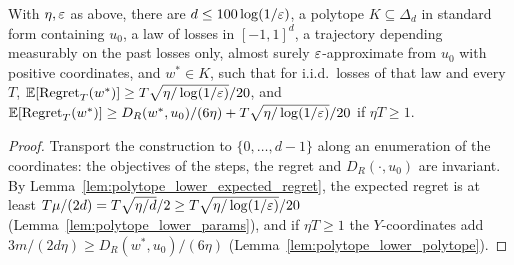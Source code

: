\begin{theorem}
  \label{thm:lb_nonsimplex}
  \leanok
  With $\eta, \varepsilon$ as above, there are $d \le 100\log(1/\varepsilon)$, a polytope $K \subseteq \Delta_d$ in
  standard form containing $u_0$, a law of losses in $[-1, 1]^d$, a trajectory depending measurably
  on the past losses only, almost surely $\varepsilon$-approximate from $u_0$ with positive coordinates,
  and $w^* \in K$, such that for i.i.d.\ losses of that law and every $T$,
  $\mathbb{E}[\mathrm{Regret}_T(w^*)] \ge T\sqrt{\eta/\log(1/\varepsilon)}/20$, and
  $\mathbb{E}[\mathrm{Regret}_T(w^*)] \ge D_R(w^*, u_0)/(6\eta) + T\sqrt{\eta/\log(1/\varepsilon)}/20$ if $\eta T \ge 1$.
\end{theorem}

\begin{proof}
  \leanok
  Transport the construction to $\{0, \dots, d - 1\}$ along an enumeration of the coordinates: the
  objectives of the steps, the regret and $D_R(\cdot, u_0)$ are invariant. By
  Lemma~\ref{lem:polytope_lower_expected_regret}, the expected regret is at least
  $T\mu/(2d) = T\sqrt{\eta/d}/2 \ge T\sqrt{\eta/\log(1/\varepsilon)}/20$
  (Lemma~\ref{lem:polytope_lower_params}), and if $\eta T \ge 1$ the $Y$-coordinates add
  $3m/(2d\eta) \ge D_R(w^*, u_0)/(6\eta)$ (Lemma~\ref{lem:polytope_lower_polytope}).
\end{proof}
